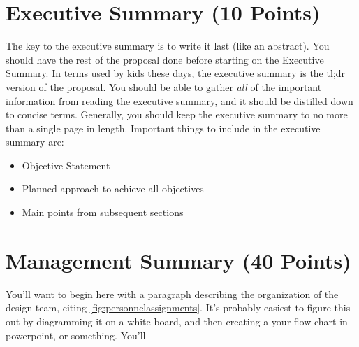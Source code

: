 \documentclass[proposal]{byu-aero}
\begin{document}
\section{Executive Summary (10 Points)}
\label{sec:ExecutiveSummary}

The key to the executive summary is to write it last (like an abstract). You should have the rest of the proposal done before starting on the Executive Summary.  In terms used by kids these days, the executive summary is the tl;dr version of the proposal. You should be able to gather \textit{all} of the important information from reading the executive summary, and it should be distilled down to concise terms. Generally, you should keep the executive summary to no more than a single page in length. Important things to include in the executive summary are:

\begin{itemize}
    \item Objective Statement
    \item Planned approach to achieve all objectives
    \item Main points from subsequent sections
\end{itemize}


\section{Management Summary (40 Points)}
\label{sec:ManagementSummary}

You'll want to begin here with a paragraph describing the organization of the design team, citing \cref{fig:personnelassignments}. It's probably easiest to figure this out by diagramming it on a white board, and then creating a your flow chart in powerpoint, or something. You'll 
\end{document}
